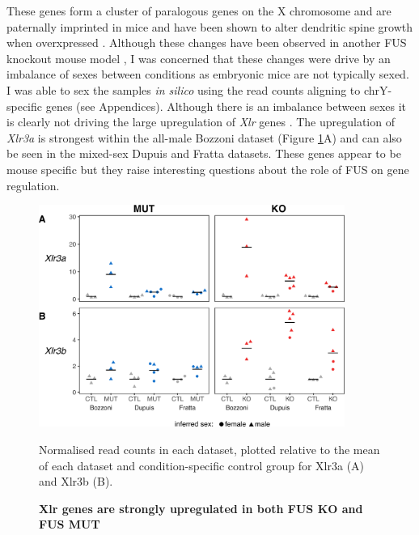 These genes form a cluster of paralogous genes on the X chromosome and are paternally imprinted in mice \cite{Raefski2005} and have been shown to alter dendritic spine growth when overxpressed \citep{Cubelos2010}. 
Although these changes have been observed in another FUS knockout mouse model \citep{Kino2015}, I was concerned that these changes were drive by an imbalance of sexes between conditions as embryonic mice are not typically sexed.
I was able to sex the samples \textit{in silico} using the read counts aligning to chrY-specific genes (see Appendices). 
Although there is an imbalance between sexes it is clearly not driving the large upregulation of \textit{Xlr} genes . 
The upregulation of \textit{Xlr3a} is strongest within the all-male Bozzoni dataset (Figure \ref{fig:fus_xlr_expression}A) and can also be seen in the mixed-sex Dupuis and Fratta datasets. 
These genes appear to be mouse specific but they raise interesting questions about the role of FUS on gene regulation.

\begin{figure}[h!]
	\centering
	\includegraphics[width=10cm]{Figures/06_fus_meta/xlr_sex_expression.png}
	\caption{\textbf{Xlr genes are strongly upregulated in both FUS KO and FUS MUT} }	
    Normalised read counts in each dataset, plotted relative to the mean of each dataset and condition-specific control group for Xlr3a (A) and Xlr3b (B). 
	\label{fig:fus_xlr_expression}
\end{figure}





